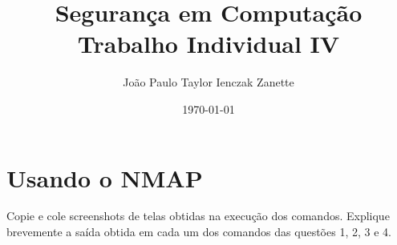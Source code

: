 \documentclass{article}
\title{%
    Segurança em Computação \\
    Trabalho Individual IV
}
\author{João Paulo Taylor Ienczak Zanette}
\date{\today}
\begin{document}
    \maketitle{}

    \section{Usando o NMAP}

    \begin{superframe}
        Copie e cole screenshots de telas obtidas na execução dos comandos.
        Explique brevemente a saída obtida em cada um dos comandos das questões
        1, 2, 3 e 4.
    \end{superframe}
\end{document}
